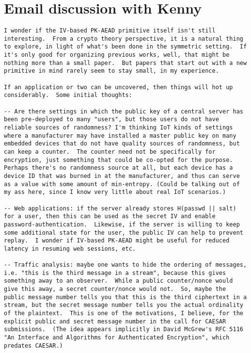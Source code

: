 \eject
\section*{Email discussion with Kenny}
\begin{minipage}{\textwidth}
\begin{lstlisting}
I wonder if the IV-based PK-AEAD primitive itself isn't still interesting.  From a crypto theory perspective, it is a natural thing to explore, in light of what's been done in the symmetric setting.  If it's only good for organizing previous works, well, that might be nothing more than a small paper.  But papers that start out with a new primitive in mind rarely seem to stay small, in my experience.

If an application or two can be uncovered, then things will hot up considerably.  Some initial thoughts:

-- Are there settings in which the public key of a central server has been pre-deployed to many "users", but those users do not have reliable sources of randomness? I'm thinking IoT kinds of settings where a manufacturer may have installed a master public key on many embedded devices that do not have quality sources of randomness, but can keep a counter.  The counter need not be specifically for encryption, just something that could be co-opted for the purpose.  Perhaps there's no randomness source at all, but each device has a device ID that was burned in at the manufacturer, and thus can serve as a value with some amount of min-entropy. (Could be talking out of my ass here, since I know very little about real IoT scenarios.)

-- Web applications: if the server already stores H(passwd || salt) for a user, then this can be used as the secret IV and enable password-authentication.  Likewise, if the server is willing to keep some additional state for the user, the public IV can help to prevent replay.  I wonder if IV-based PK-AEAD might be useful for reduced latency in resuming web sessions, etc.

-- Traffic analysis: maybe one wants to hide the ordering of messages, i.e. "this is the third message in a stream", because this gives something away to an observer.  While a public counter/nonce would give this away, a secret counter/nonce would not.  So, maybe the public message number tells you that this is the third ciphertext in a stream, but the secret message number tells you the actual ordinality of the plaintext.  This is one of the motivations, I believe, for the explicit public and secret message number in the call for CAESAR submissions.  (The idea appears implicitly in David McGrew's RFC 5116 "An Interface and Algorithms for Authenticated Encryption", which predates CAESAR.) 


\end{lstlisting}
\end{minipage}
